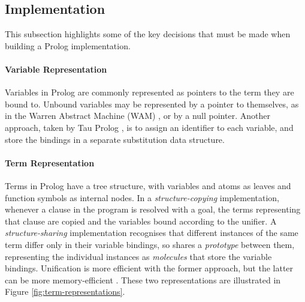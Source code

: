 \subsection{Implementation}

\label{sec:preparation-implementation}

This subsection highlights some of the key decisions that must be made when building a Prolog implementation.

\paragraph{Variable Representation} Variables in Prolog are commonly represented as pointers to the term they are bound to. Unbound variables may be represented by a pointer to themselves, as in the Warren Abstract Machine (WAM) \cite{warrenAbstractPrologInstruction1983}, or by a null pointer. Another approach, taken by Tau Prolog \cite{riazaTauPrologProlog2024}, is to assign an identifier to each variable, and store the bindings in a separate substitution data structure.

\paragraph{Term Representation} Terms in Prolog have a tree structure, with variables and atoms as leaves and function symbols as internal nodes. In a \emph{structure-copying} implementation, whenever a clause in the program is resolved with a goal, the terms representing that clause are copied and the variables bound according to the unifier. A \emph{structure-sharing} implementation recognises that different instances of the same term differ only in their variable bindings, so shares a \emph{prototype} between them, representing the individual instances as \emph{molecules} that store the variable bindings. Unification is more efficient with the former approach, but the latter can be more memory-efficient \cite{linewtermrepresentation1998}. These two representations are illustrated in Figure \ref{fig:term-representations}.

